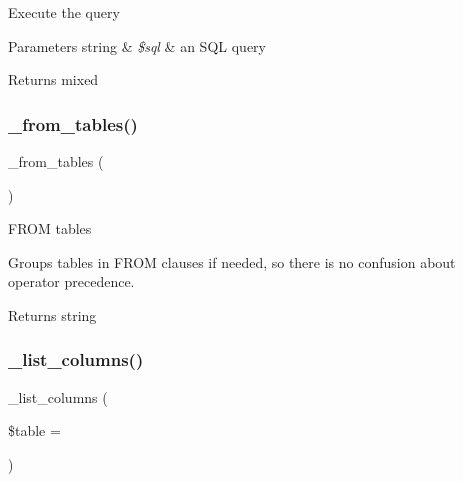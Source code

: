 Execute the query


\begin{DoxyParams}[1]{Parameters}
string & {\em \$sql} & an S\+QL query \\
\hline
\end{DoxyParams}
\begin{DoxyReturn}{Returns}
mixed 
\end{DoxyReturn}
\mbox{\label{class_c_i___d_b__mysql__driver_aef43f7e3e7b71d337ff3724c5eb14f10}} 
\subsubsection{\texorpdfstring{\+\_\+from\+\_\+tables()}{\_from\_tables()}}
{\footnotesize\ttfamily \+\_\+from\+\_\+tables (\begin{DoxyParamCaption}{ }\end{DoxyParamCaption})\hspace{0.3cm}{\ttfamily [protected]}}

F\+R\+OM tables

Groups tables in F\+R\+OM clauses if needed, so there is no confusion about operator precedence.

\begin{DoxyReturn}{Returns}
string 
\end{DoxyReturn}
\mbox{\label{class_c_i___d_b__mysql__driver_a7ccb7f9c301fe7f0a9db701254142b63}} 
\subsubsection{\texorpdfstring{\+\_\+list\+\_\+columns()}{\_list\_columns()}}
{\footnotesize\ttfamily \+\_\+list\+\_\+columns (\begin{DoxyParamCaption}\item[{}]{\$table = {\ttfamily \textquotesingle{}\textquotesingle{}} }\end{DoxyParamCaption})\hspace{0.3cm}{\ttfamily [protected]}}

